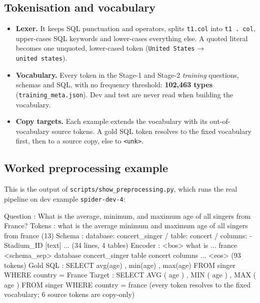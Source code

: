 \documentclass[
  10pt,
]{article}
\newenvironment{Shaded}{}{}
\newcommand{\NormalTok}[1]{#1}
\providecommand{\tightlist}{%
  \setlength{\itemsep}{0pt}\setlength{\parskip}{0pt}}
\begin{document}
\subsection{Tokenisation and
vocabulary}\label{tokenisation-and-vocabulary}

\begin{itemize}
\tightlist
\item
  \textbf{Lexer.} It keeps SQL punctuation and operators, splits
  \texttt{t1.col} into \texttt{t1\ .\ col}, upper-cases SQL keywords and
  lower-cases everything else. A quoted literal becomes one unquoted,
  lower-cased token
  (\texttt{\textquotesingle{}United\ States\textquotesingle{}} →
  \texttt{united\ states}).
\item
  \textbf{Vocabulary.} Every token in the Stage-1 and Stage-2
  \emph{training} questions, schemas and SQL, with no frequency
  threshold: \textbf{102,463 types} (\texttt{training\_meta.json}). Dev
  and test are never read when building the vocabulary.
\item
  \textbf{Copy targets.} Each example extends the vocabulary with its
  out-of-vocabulary source tokens. A gold SQL token resolves to the
  fixed vocabulary first, then to a source copy, else to
  \texttt{\textless{}unk\textgreater{}}.
\end{itemize}

\subsection{Worked preprocessing
example}\label{worked-preprocessing-example}

This is the output of \texttt{scripts/show\_preprocessing.py}, which
runs the real pipeline on dev example \texttt{spider-dev-4}:

\begin{Shaded}
\begin{Highlighting}[]
\NormalTok{Question : What is the average, minimum, and maximum age of all singers from France?}
\NormalTok{Tokens   : what is the average minimum and maximum age of all singers from france   (13)}
\NormalTok{Schema   : database: concert\_singer / table: concert / columns: {-} Stadium\_ID [text] ...}
\NormalTok{           (34 lines, 4 tables)}
\NormalTok{Encoder  : \textless{}bos\textgreater{} what is ... france \textless{}schema\_sep\textgreater{} database concert\_singer table concert}
\NormalTok{           columns ... \textless{}eos\textgreater{}   (93 tokens)}
\NormalTok{Gold SQL : SELECT avg(age) , min(age) , max(age) FROM singer WHERE country = \textquotesingle{}France\textquotesingle{}}
\NormalTok{Target   : SELECT AVG ( age ) , MIN ( age ) , MAX ( age ) FROM singer WHERE country = france}
\NormalTok{           (every token resolves to the fixed vocabulary; 6 source tokens are copy{-}only)}
\end{Highlighting}
\end{Shaded}
\end{document}
